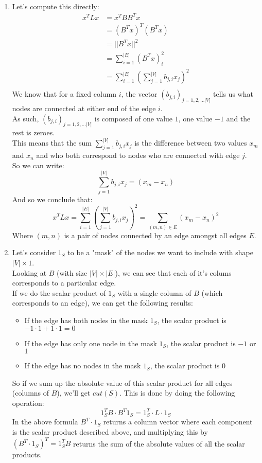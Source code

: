 \documentclass[11pt, legalpaper]{article}
\begin{document}
\begin{enumerate}
            \item Let's compute this directly:
            \begin{align*}
                x^TLx &= x^TBB^Tx\\
                &= (B^Tx)^T(B^Tx)\\
                &= ||B^Tx||^2 \\
                &= \sum_{i=1}^{|E|}(B^Tx)_i^2\\
                &= \sum_{i=1}^{|E|}\left(\sum_{j=1}^{|V|}b_{j,i}x_j\right)^2\\
            \end{align*}
            We know that for a fixed column $i$, the vector $(b_{j,i})_{j=1,2,... |V|}$ tells us what nodes are connected at either end of the edge $i$. \\
            As such, $(b_{j,i})_{j=1,2,... |V|}$ is composed of one value $1$, one value $-1$ and the rest is zeroes. \\
            This means that the sum $\sum_{j=1}^{|V|}b_{j,i}x_j$ is the difference between two values $x_m$ and $x_n$ and who both correspond to nodes who are connected with edge $j$. \\
            So we can write:
            $$\sum_{j=1}^{|V|}b_{j,i}x_j=(x_{m}-x_{n})$$
            And so we conclude that:
            $$x^TLx=\sum_{i=1}^{|E|}\left(\sum_{j=1}^{|V|}b_{j,i}x_j\right)^2=\sum_{(m,n) \in E}(x_{m}-x_{n})^2$$
            Where $(m,n)$ is a pair of nodes connected by an edge amongst all edges $E$.
            \item Let's consider $1_S$ to be a "mask" of the nodes we want to include with shape $|V| \times 1$.\\
            Looking at $B$ (with size $|V| \times |E|$), we can see that each of it's colums corresponds to a particular edge.\\
            If we do the scalar product of $1_S$ with a single column of $B$ (which corresponds to an edge), we can get the following results:
            \begin{itemize}
                \item If the edge has both nodes in the mask $1_S$, the scalar product is $-1 \cdot 1 +1 \cdot 1=0$
                \item If the edge has only one node in the mask $1_S$, the scalar product is $-1$ or $1$
                \item If the edge has no nodes in the mask $1_S$, the scalar product is $0$
            \end{itemize}
            So if we sum up the absolute value of this scalar product for all edges (columns of $B$), we'll get $cut(S)$. This is done by doing the following operation:
            $$\boxed{1_S^TB \cdot B^T 1_S=1_S^T \cdot L \cdot1_S}$$
            In the above formula $B^T \cdot 1_S$ returns a column vector where each component is the scalar product described above, and multiplying this by $(B^T \cdot 1_S)^T=1_S^T B$ returns the sum of the absolute values of all the scalar products.


\end{enumerate}
\end{document}
